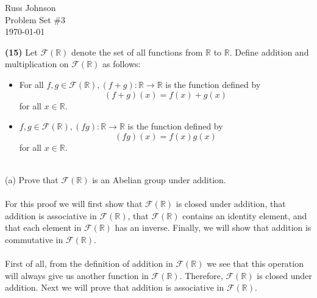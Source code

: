 \documentclass[11pt,a4paper]{article}
\begin{document}
\begin{flushright}
Russ Johnson\\
Problem Set $\#3$\\
\today\\
\end{flushright}

{\bf (15)} Let $\mathcal{F}(\mathbb{R})$ denote the set of all functions from $\mathbb{R}$ to $\mathbb{R}$. Define addition and multiplication on $\mathcal{F}(\mathbb{R})$ as follows:
\begin{itemize}
\item For all $f,g \in \mathcal{F}(\mathbb{R}), (f + g) :\mathbb{R} \rightarrow \mathbb{R}$ is the function defined by
\[(f+g)(x) = f(x)+g(x)\]
for all $x\in\mathbb{R}$.
\item $f,g \in \mathcal{F}(\mathbb{R}), (fg) :\mathbb{R} \rightarrow \mathbb{R}$ is the function defined by
\[(fg)(x) = f(x)g(x)\]
for all $x\in\mathbb{R}$.
\end{itemize}
~\\
(a) Prove that $\mathcal{F}(\mathbb{R})$ is an Abelian group under addition.\\
~\\
For this proof we will first show that $\mathcal{F}(\mathbb{R})$ is closed under addition, that addition is associative in $\mathcal{F}(\mathbb{R})$, that $\mathcal{F}(\mathbb{R})$ contains an identity element, and that each element in $\mathcal{F}(\mathbb{R})$ has an inverse. Finally, we will show that addition is commutative in $\mathcal{F}(\mathbb{R})$.\\
~\\
First of all, from the definition of addition in $\mathcal{F}(\mathbb{R})$ we see that this operation will always give us another function in $\mathcal{F}(\mathbb{R})$. Therefore, $\mathcal{F}(\mathbb{R})$ is closed under addition. Next we will prove that  addition is associative in $\mathcal{F}(\mathbb{R})$.
\end{document}
